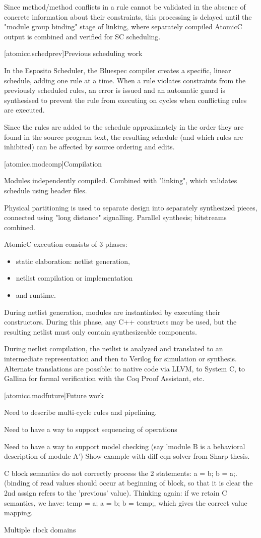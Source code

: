 Since method/method conflicts in a rule cannot be validated in the absence of
concrete information about their constraints,
this processing is delayed until the "module group binding"
stage of linking, where separately compiled AtomicC output is combined and
verified
for SC scheduling.

[atomicc.schedprev]{Previous scheduling work}

In the Esposito Scheduler\cite{Esposito:Patent},
the Bluespec compiler creates a specific, linear schedule, adding
one rule at a time.  When a rule violates constraints from the previously scheduled
rules, an error is issued and an automatic guard is synthesised to prevent the
rule from executing on cycles when conflicting rules are executed.

Since the rules are added to the schedule approximately in the order they are
found in the source program text, the resulting schedule (and which rules are
inhibited) can be affected by source ordering and edits.

[atomicc.modcomp]{Compilation}

Modules independently compiled.  Combined with "linking", which validates schedule using header files.

Physical partitioning is used to separate design into separately synthesized pieces, connected using
"long distance" signalling.  Parallel synthesis; bitstreams combined.

AtomicC execution consists of 3 phases:
\begin{itemize}
\item static elaboration: netlist generation, 
\item netlist compilation or implementation
\item and runtime.
\end{itemize}

During netlist
generation, modules are instantiated by executing their
constructors. During this phase, any C++ constructs may be used, but
the resulting netlist must only contain synthesizeable components.

During netlist compilation, the netlist is analyzed and translated to
an intermediate representation and then to Verilog for simulation or
synthesis. Alternate translations are possible: to native code via
LLVM, to System C, to Gallina for formal verification with the Coq
Proof Assistant, etc.

[atomicc.modfuture]{Future work}

Need to describe multi-cycle rules and pipelining.

Need to have a way to support sequencing of operations

Need to have a way to support model checking (say 'module B is a behavioral description of module A')
Show example with diff eqn solver from Sharp thesis.

C block semantics do not correctly process the 2 statements: a = b; b = a;.
(binding of read values should occur at beginning of block, so that it is clear the
2nd assign refers to the 'previous' value).
Thinking again: if we retain C semantics, we have: temp = a; a = b; b = temp;, which
gives the correct value mapping.

Multiple clock domains
